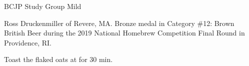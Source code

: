 \stylesection{\styledarkmild}

\begin{recipe}{BCJP Study Group Mild}

\begin{aboutblock}
Ross Druckenmiller of Revere, MA. Bronze medal in Category \#12: Brown British
Beer during the 2019 National Homebrew Competition Final Round in Providence, RI.
\sourceaha
\end{aboutblock}


\begin{methodandtiming}

\begin{mashsteps}
\end{mashsteps}

\begin{fermentationsteps}
\end{fermentationsteps}

\begin{directions}
Toast the flaked oats at  for 30 min.
\end{directions}

\end{methodandtiming}

\recipebreak

\begin{ingredientsblock}

\begin{malts}
\end{malts}

\begin{hops}
\end{hops}


\end{ingredientsblock}

\end{recipe}

